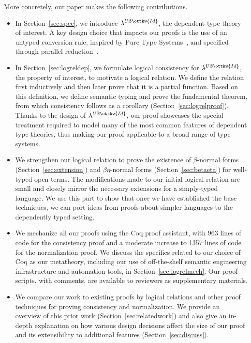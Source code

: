 \documentclass[acmsmall,screen=true,
\ifpublic review=false\else,review=true\fi
  ,anonymous=\ifanonymous true\else false\fi]{acmart}
\newcommand{\lang}{$\lambda^{U\mathbb{B}\ottkw{Id}}$\xspace}
\newcommand{\scw}[1]{}
\newcommand{\yl}[1]{}
\begin{document}
More concretely, our paper makes the following contributions.
\begin{itemize}
\item In Section~\ref{sec:spec}, we introduce \lang{}, the dependent type
  theory of interest. A key design choice that impacts our proofs is the use
  of an untyped conversion rule, inspired by Pure Type
  Systems~\citep{barendregt1991introduction}, and specified through parallel
  reduction~\citep{takahashi-parallel-reduction,
    barendregt:lambda-calculi-with-types}.
\item In Section~\ref{sec:logreldep}, we formulate logical consistency for
  \lang{}, the property of interest, to motivate a logical relation. We define
  the relation first inductively and then later prove that it is a partial
  function. Based on this definition, we define semantic typing and prove the
  fundamental theorem, from which consistency follows as a corollary
  (Section~\ref{sec:logrelproof}). Thanks to the design of \lang{}, our proof
  showcases the special treatment required to model many of the most common
  features of dependent type theories, thus making our proof applicable to a
  broad range of type systems.
\item We strengthen our logical relation to prove the existence of
  $\beta$-normal forms (Section~\ref{sec:extension}) and $\beta\eta$-normal
  forms (Section~\ref{sec:betaeta}) for well-typed open terms. The
  modifications made to our initial logical relation are small and closely
  mirror the necessary extensions for a simply-typed language. We use this
  part to show that once we have established the base techniques, we can port
  ideas from proofs about simpler languages to the dependently typed setting.
\item We mechanize all our proofs using the Coq proof assistant, with 963
  lines of code for the consistency proof and a moderate increase to 1357
  lines of code for the normalization proof.  We discuss the specifics related
  to our choice of Coq as our metatheory, including our use of off-the-shelf
  semantic engineering infrastructure and automation tools, in
  Section~\ref{sec:logrelmech}.  Our proof scripts, with comments, are
  available to reviewers as supplementary materials.
  \yl{I want to say something about the benefits of using existing libraries
    such as Autosubst 2 and CoqHammer rather than rolling your own
    undocumented libraries that nobody want to (or can) reuse.}\scw{Save that
    for the mechanization section}
\item We compare our work to existing proofs by logical relations and other
  proof techniques for proving consistency and normalization.  We provide an
  overview of this prior work (Section~\ref{sec:relatedwork}) and also give an
  in-depth explanation on how various design decisions affect the size of our
  proof and its extensibility to additional features
  (Section~\ref{sec:discuss}).
\end{itemize}
\end{document}
